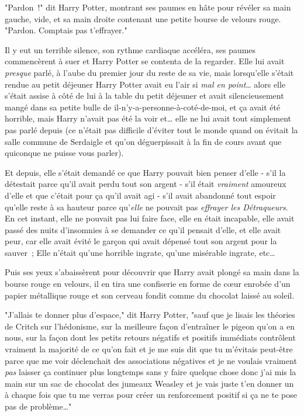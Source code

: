 "Pardon~!" dit Harry Potter, montrant ses paumes en hâte pour révéler sa main gauche, vide, et sa main droite contenant une petite bourse de velours rouge. "Pardon. Comptais pas t'effrayer."

Il y eut un terrible silence, son rythme cardiaque accéléra, ses paumes commencèrent à suer et Harry Potter se contenta de la regarder. Elle lui avait \emph{presque} parlé, à l'aube du premier jour du reste de sa vie, mais lorsqu'elle s'était rendue au petit déjeuner Harry Potter avait eu l'air si \emph{mal en point}… alors elle s'était assise à côté de lui à la table du petit déjeuner et avait silencieusement mangé dans sa petite bulle de il-n'y-a-personne-à-coté-de-moi, et ça avait été horrible, mais Harry n'avait pas été la voir et… elle ne lui avait tout simplement pas parlé depuis (ce n'était pas difficile d'éviter tout le monde quand on évitait la salle commune de Serdaigle et qu'on déguerpissait à la fin de cours avant que quiconque ne puisse vous parler).

Et depuis, elle s'était demandé ce que Harry pouvait bien penser d'elle - s'il la détestait parce qu'il avait perdu tout son argent - s'il était \emph{vraiment} amoureux d'elle et que c'était pour ça qu'il avait agi - s'il avait abandonné tout espoir qu'elle reste à sa hauteur parce qu'\emph{elle} ne pouvait pas \emph{effrayer les Détraqueurs}. En cet instant, elle ne pouvait pas lui faire face, elle en était incapable, elle avait passé des nuits d'insomnies à se demander ce qu'il pensait d'elle, et elle avait peur, car elle avait évité le garçon qui avait dépensé tout son argent pour la sauver~; Elle n'était qu'une horrible ingrate, qu'une misérable ingrate, etc…

Puis ses yeux s'abaissèrent pour découvrir que Harry avait plongé sa main dans la bourse rouge en velours, il en tira une confiserie en forme de cœur enrobée d'un papier métallique rouge et son cerveau fondit comme du chocolat laissé au soleil.

"J'allais te donner plus d'espace," dit Harry Potter, "sauf que je lisais les théories de Critch sur l'hédonisme, sur la meilleure façon d'entraîner le pigeon qu'on a en nous, sur la façon dont les petits retours négatifs et positifs immédiats contrôlent vraiment la majorité de ce qu'on fait et je me suis dit que tu m'évitais peut-être parce que me voir déclenchait des associations négatives et je ne voulais vraiment \emph{pas} laisser ça continuer plus longtemps sans y faire quelque chose donc j'ai mis la main sur un sac de chocolat des jumeaux Weasley et je vais juste t'en donner un à chaque fois que tu me verras pour créer un renforcement positif si ça ne te pose pas de problème…"


